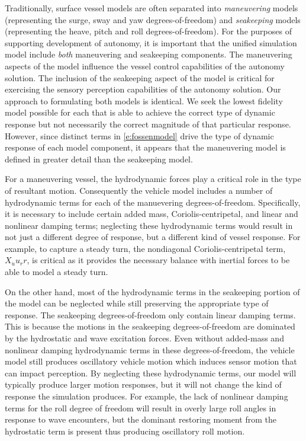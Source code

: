 \documentclass[utf8]{frontiersSCNS} %
\begin{document}
Traditionally, surface vessel models are often separated into \emph{maneuvering} models (representing the surge, sway and yaw degrees-of-freedom) and \emph{seakeeping} models (representing the heave, pitch and roll degrees-of-freedom). For the purposes of supporting development of autonomy, it is important that the unified simulation model include \emph{both} maneuvering and seakeeping components. The maneuvering aspects of the model influence the vessel control capabilities of the autonomy solution. The inclusion of the seakeeping aspect of the model is critical for exercising the sensory perception capabilities of the autonomy solution. Our approach to formulating both models is identical. We seek the lowest fidelity model possible for each that is able to achieve the correct type of dynamic response but not necessarily the correct magnitude of that particular response. However, since distinct terms in \eqref{e:fossenmodel} drive the type of dynamic response of each model component, it appears that the maneuvering model is defined in greater detail than the seakeeping model.

For a maneuvering vessel, the hydrodynamic forces play a critical role in the type of resultant motion. Consequently the vehicle model includes a number of hydrodynamic terms for each of the manuevering degrees-of-freedom. Specifically, it is necessary to include certain added mass, Coriolis-centripetal, and linear and nonlinear damping terms; neglecting these hydrodynamic terms would result in not just a different degree of response, but a different kind of vessel response. For example, to capture a steady turn, the nondiagonal Coriolis-centripetal term, $X_{\dot{u}}u_r r$, is critical as it provides the necessary balance with inertial forces to be able to model a steady turn.

On the other hand, most of the hydrodynamic terms in the seakeeping portion of the model can be neglected while still preserving the appropriate type of response. The seakeeping degrees-of-freedom only contain linear damping terms. This is because the motions in the seakeeping degrees-of-freedom are dominated by the hydrostatic and wave excitation forces. Even without added-mass and nonlinear damping hydrodynamic terms in these degrees-of-freedom, the vehicle model still produces oscillatory vehicle motion which induces sensor motion that can impact perception. By neglecting these hydrodynamic terms, our model will typically produce larger motion responses, but it will not change the kind of response the simulation produces. For example, the lack of nonlinear damping terms for the roll degree of freedom will result in overly large roll angles in response to wave encounters, but the dominant restoring moment from the hydrostatic term is present thus producing oscillatory roll motion.
\end{document}
